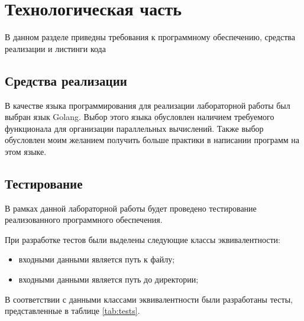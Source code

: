 \chapter{Технологическая часть}
В данном разделе приведны требования к программному обеспечению, средства реализации и листинги кода


\section{Средства реализации}

В качестве языка программирования для реализации лаборатор­ной работы был выбран язык Golang\cite{golang}. 
Выбор этого языка обусловлен наличием требуемого функционала для организации параллельных 
вы­числений. Также выбор обусловлен моим желанием получить больше практики в написании программ на этом языке.


\section{Тестирование}

В рамках данной лабораторной работы будет проведено тестирование реализованного программного обеспечения.

При разработке тестов были выделены следующие классы эквивалентности:
\begin{itemize}
    \item входными данными является путь к файлу;
    \item входными данными является путь до директории;
\end{itemize}

В соответствии с данными классами эквивалентности были разработаны тесты, представленные в таблице \ref{tab:tests}.

